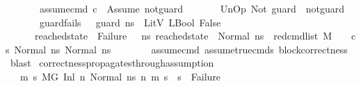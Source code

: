 \begin{isabellebody}
\ \ \ \ \ \ \ assume{\isacharunderscore}{\kern0pt}cmd{\isacharcolon}{\kern0pt}\ {\isachardoublequoteopen}c\ {\isacharequal}{\kern0pt}\ Assume\ not{\isacharunderscore}{\kern0pt}guard{\isachardoublequoteclose}\isanewline
\ \ \ \ \ \ \ {\isachardoublequoteopen}UnOp\ Not\ guard\ {\isasymsim}\ not{\isacharunderscore}{\kern0pt}guard{\isachardoublequoteclose}\ %
\isanewline
\ \ \ \ \ \ \ guard{\isacharunderscore}{\kern0pt}fails{\isacharcolon}{\kern0pt}\ {\isachardoublequoteopen}{\isasymLambda}{\isacharcomma}{\kern0pt}{\isasymGamma}{\isacharcomma}{\kern0pt}{\isasymOmega}\ {\isasymturnstile}\ {\isasymlangle}guard{\isacharcomma}{\kern0pt}\ ns{}{\isasymrangle}\ {\isasymDown}\ LitV\ {\isacharparenleft}{\kern0pt}LBool\ False{\isacharparenright}{\kern0pt}{\isachardoublequoteclose}\isanewline
\ \ \ \ \ \ {\isachardoublequoteopen}reached{\isacharunderscore}{\kern0pt}state\ {\isasymnoteq}\ Failure\ {\isasymand}\ {\isacharparenleft}{\kern0pt}{\isasymforall}\ ns{}{\isacharprime}{\kern0pt}{\isachardot}{\kern0pt}\ reached{\isacharunderscore}{\kern0pt}state\ {\isacharequal}{\kern0pt}\ Normal\ ns{}{\isacharprime}{\kern0pt}\ {\isasymlongrightarrow}\ {\isacharparenleft}{\kern0pt}red{\isacharunderscore}{\kern0pt}cmd{\isacharunderscore}{\kern0pt}list\ M\ {\isasymLambda}\ {\isasymGamma}\ {\isasymOmega}\ {\isacharparenleft}{\kern0pt}cs{}{\isacharparenright}{\kern0pt}\ {\isacharparenleft}{\kern0pt}Normal\ ns{}{\isacharparenright}{\kern0pt}\ {\isacharparenleft}{\kern0pt}Normal\ ns{}{\isacharprime}{\kern0pt}{\isacharparenright}{\kern0pt}{\isacharparenright}{\kern0pt}{\isacharparenright}{\kern0pt}{\isachardoublequoteclose}\ \isanewline
%
\isadelimproof
\ \ \ \ \ %
\endisadelimproof
%
\isatagproof
{}\isamarkupfalse%
\ assume{\isacharunderscore}{\kern0pt}cmd\ assume{\isacharunderscore}{\kern0pt}true{\isacharunderscore}{\kern0pt}cmds\ block{\isacharunderscore}{\kern0pt}correctness\ \isamarkupfalse%
\ blast%
\endisatagproof
{\isafoldproof}%
%
\isadelimproof
\isanewline
%
\endisadelimproof
\isanewline
{}\isamarkupfalse%
\ correctness{\isacharunderscore}{\kern0pt}propagates{\isacharunderscore}{\kern0pt}through{\isacharunderscore}{\kern0pt}assumption{\isacharcolon}{\kern0pt}\isanewline
\ \ \ {\isachardoublequoteopen}{\isasymforall}m\ s{\isachardot}{\kern0pt}\ {\isacharparenleft}{\kern0pt}M{\isacharcomma}{\kern0pt}{\isasymLambda}{\isacharcomma}{\kern0pt}{\isasymGamma}{\isacharcomma}{\kern0pt}{\isasymOmega}{\isacharcomma}{\kern0pt}G\ {\isasymturnstile}{\isacharparenleft}{\kern0pt}Inl\ n{}{\isacharcomma}{\kern0pt}\ Normal\ ns{}{\isacharparenright}{\kern0pt}\ {\isacharminus}{\kern0pt}n{\isasymrightarrow}{\isacharasterisk}{\kern0pt}\ {\isacharparenleft}{\kern0pt}m{\isacharcomma}{\kern0pt}\ s{\isacharparenright}{\kern0pt}{\isacharparenright}{\kern0pt}\ {\isasymlongrightarrow}\ s\ {\isasymnoteq}\ Failure{\isachardoublequoteclose}\isanewline

\end{isabellebody}

